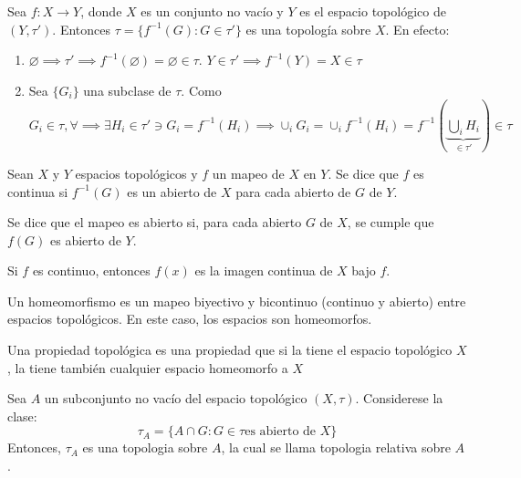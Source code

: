 \begin{ejemplo}
    Sea $f:X\to Y$, donde $X$ es un conjunto no vacío y $Y$ es el espacio topológico de $(Y,\tau')$. Entonces $\tau=\{f^{-1}(G):G\in \tau'\}$ es una topología sobre $X$. En efecto:
    \begin{enumerate}
        \item $\varnothing\implies \tau'\implies f^{-1}(\varnothing)=\varnothing\in\tau$. $Y\in \tau'\implies f^{-1}(Y)=X\in\tau$
        \item Sea $\{G_i\}$ una subclase de $\tau$. Como $G_i\in \tau,\forall \implies \exists H_i\in \tau'\ni G_i=f^{-1}(H_i)\implies \cup_i G_i=\cup_{i}f^{-1}(H_i)=f^{-1}(\underbrace{\bigcup_i H_i}_{\in \tau'})\in \tau $
    \end{enumerate}
\end{ejemplo}

\begin{definicion}
    Sean $X$ y $Y$ espacios topológicos y $f$ un mapeo de $X$ en $Y$. Se dice que $f$ es continua si $f^{-1}(G)$ es un abierto de $X$ para cada abierto de $G$ de $Y$. 
\end{definicion}

\begin{definicion}
    Se dice que el mapeo es abierto si, para cada abierto $G$ de $X$, se cumple que $f(G)$ es abierto de $Y$. 
\end{definicion}

\begin{definicion}
    Si $f$ es continuo, entonces $f(x)$ es la imagen continua de $X$ bajo $f$. 
\end{definicion}

\begin{definicion}[Homeomorfismo]
    Un homeomorfismo es un mapeo biyectivo y bicontinuo (continuo y abierto) entre espacios topológicos. En este caso, los espacios son homeomorfos. 
\end{definicion}

\begin{cajita}
    \begin{nota}
        Una propiedad topológica es una propiedad que si la tiene el espacio topológico $X$, la tiene  también cualquier espacio homeomorfo a $X$
    \end{nota}
\end{cajita}



\begin{nota}
    Sea $A$ un subconjunto no vacío del espacio topológico $(X,\tau)$. Considerese la clase: 
    $$\tau_A=\{A\cap G: G\in\tau \text{es abierto de $X$}\}$$
    Entonces, $\tau_A$ es una topologia sobre $A$, la cual se llama topologia relativa sobre $A$.
\end{nota}

